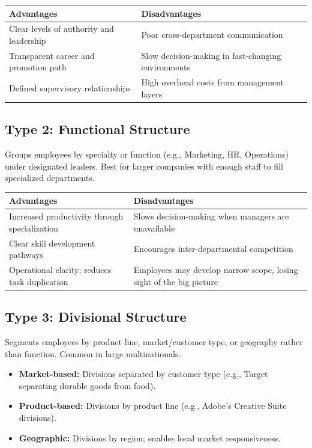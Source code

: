 \documentclass[11pt, letterpaper]{article}
\begin{document}
\begin{center}
\begin{tabular}{p{6.5cm} p{6.5cm}}
\toprule
\textbf{Advantages} & \textbf{Disadvantages} \\
\midrule
Clear levels of authority and leadership & Poor cross-department communication \\
Transparent career and promotion path & Slow decision-making in fast-changing environments \\
Defined supervisory relationships & High overhead costs from management layers \\
\bottomrule
\end{tabular}
\end{center}

\subsection{Type 2: Functional Structure}
Groups employees by specialty or function (e.g., Marketing, HR, Operations) under designated leaders. Best for larger companies with enough staff to fill specialized departments.

\begin{center}
\begin{tabular}{p{6.5cm} p{6.5cm}}
\toprule
\textbf{Advantages} & \textbf{Disadvantages} \\
\midrule
Increased productivity through specialization & Slows decision-making when managers are unavailable \\
Clear skill development pathways & Encourages inter-departmental competition \\
Operational clarity; reduces task duplication & Employees may develop narrow scope, losing sight of the big picture \\
\bottomrule
\end{tabular}
\end{center}

\subsection{Type 3: Divisional Structure}
Segments employees by product line, market/customer type, or geography rather than function. Common in large multinationals.

\begin{itemize}[leftmargin=*, label=--]
  \item \textbf{Market-based:} Divisions separated by customer type (e.g., Target separating durable goods from food).
  \item \textbf{Product-based:} Divisions by product line (e.g., Adobe's Creative Suite divisions).
  \item \textbf{Geographic:} Divisions by region; enables local market responsiveness.
\end{itemize}
\end{document}
